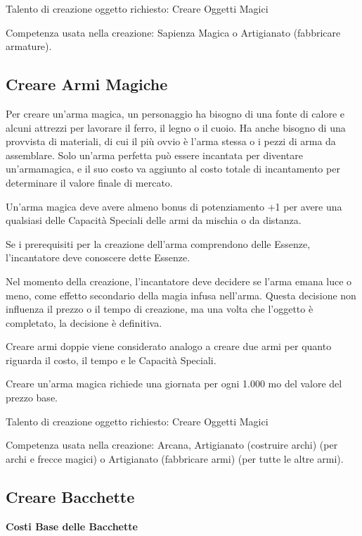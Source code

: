 \documentclass[a4paper,11pt,twoside,openany]{book}
\begin{document}
{Talento di creazione oggetto richiesto: Creare Oggetti Magici

Competenza usata nella creazione: Sapienza Magica o Artigianato (fabbricare armature).

\subsection{Creare Armi Magiche}

Per creare un'arma magica, un personaggio ha bisogno di una fonte di calore e alcuni attrezzi per lavorare il ferro, il legno o il cuoio. Ha anche bisogno di una provvista di materiali, di cui il più ovvio è l'arma stessa o i pezzi di arma da assemblare. Solo un'arma perfetta può essere incantata per diventare un'armamagica, e il suo costo va aggiunto al costo totale di incantamento per determinare il valore finale di mercato.

Un'arma magica deve avere almeno bonus di potenziamento +1 per avere una qualsiasi delle Capacità Speciali delle armi da mischia o da distanza.

Se i prerequisiti per la creazione dell'arma comprendono delle Essenze, l'incantatore deve conoscere dette Essenze.

Nel momento della creazione, l'incantatore deve decidere se l'arma emana luce o meno, come effetto secondario della magia infusa nell'arma. Questa decisione non influenza il prezzo o il tempo di creazione, ma una volta che l'oggetto è completato, la decisione è definitiva.

Creare armi doppie viene considerato analogo a creare due armi per quanto riguarda il costo, il tempo e le Capacità Speciali.

Creare un'arma magica richiede una giornata per ogni 1.000 mo del valore del prezzo base.

Talento di creazione oggetto richiesto: Creare Oggetti Magici

Competenza usata nella creazione: Arcana, Artigianato (costruire archi) (per archi e frecce magici) o Artigianato (fabbricare armi) (per tutte le altre armi).

\subsection{Creare Bacchette}

\bigskip

\textbf{Costi Base delle Bacchette}

}
\end{document}
